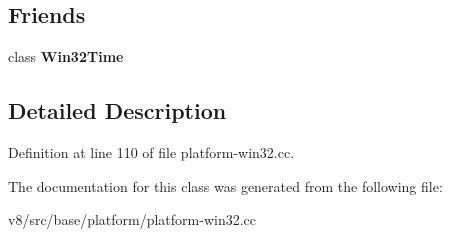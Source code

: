 \subsection*{Friends}
\begin{DoxyCompactItemize}
\item 
\mbox{\label{classv8_1_1base_1_1WindowsTimezoneCache_af4edcf9562e8b46fd0c750ecd489bead}} 
class {\bfseries Win32\+Time}
\end{DoxyCompactItemize}


\subsection{Detailed Description}


Definition at line 110 of file platform-\/win32.\+cc.



The documentation for this class was generated from the following file\+:\begin{DoxyCompactItemize}
\item 
v8/src/base/platform/platform-\/win32.\+cc\end{DoxyCompactItemize}

